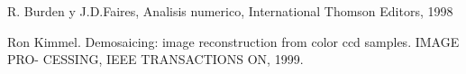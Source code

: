 \begin{thebibliography}{9}

  R. Burden y J.D.Faires, Analisis numerico, International Thomson Editors, 1998

Ron Kimmel. Demosaicing: image reconstruction from color ccd samples. IMAGE PRO-
CESSING, IEEE TRANSACTIONS ON, 1999.

\end{thebibliography}
